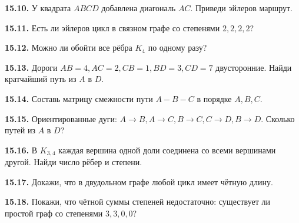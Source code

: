 \noindent\begin{minipage}[t]{\linewidth}\textbf{15.10.} У квадрата \(ABCD\) добавлена диагональ \(AC\). Приведи эйлеров маршрут.\par\end{minipage}\par
\noindent\begin{minipage}[t]{\linewidth}\textbf{15.11.} Есть ли эйлеров цикл в связном графе со степенями \(2,2,2,2\)?\par\end{minipage}\par
\noindent\begin{minipage}[t]{\linewidth}\textbf{15.12.} Можно ли обойти все рёбра \(K_4\) по одному разу?\par\end{minipage}\par
\noindent\begin{minipage}[t]{\linewidth}\textbf{15.13.} Дороги \(AB=4,AC=2,CB=1,BD=3,CD=7\) двусторонние. Найди кратчайший путь из \(A\) в \(D\).\par\end{minipage}\par
\noindent\begin{minipage}[t]{\linewidth}\textbf{15.14.} Составь матрицу смежности пути \(A-B-C\) в порядке \(A,B,C\).\par\end{minipage}\par
\noindent\begin{minipage}[t]{\linewidth}\textbf{15.15.} Ориентированные дуги: \(A\to B,A\to C,B\to C,C\to D,B\to D\). Сколько путей из \(A\) в \(D\)?\par\end{minipage}\par
\noindent\begin{minipage}[t]{\linewidth}\textbf{15.16.} В \(K_{3,4}\) каждая вершина одной доли соединена со всеми вершинами другой. Найди число рёбер и степени.\par\end{minipage}\par
\noindent\begin{minipage}[t]{\linewidth}\textbf{15.17.}\starmark{} Докажи, что в двудольном графе любой цикл имеет чётную длину.\par\end{minipage}\par
\noindent\begin{minipage}[t]{\linewidth}\textbf{15.18.}\starmark{} Покажи, что чётной суммы степеней недостаточно: существует ли простой граф со степенями \(3,3,0,0\)?\par\end{minipage}\par
